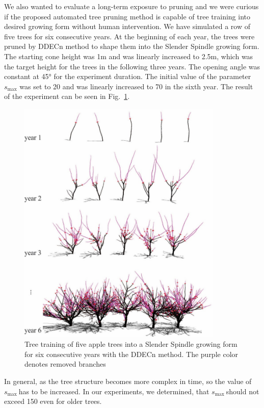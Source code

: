 We also wanted to evaluate a long-term exposure to pruning and we were
curious if the proposed automated tree pruning method is capable of tree
training into desired growing form without human intervention. We have
simulated a row of five trees for six consecutive years. At the
beginning of each year, the trees were pruned by DDECn method to shape
them into the Slender Spindle growing form. The starting cone height was
1m and was linearly increased to 2.5m, which was the target height for
the trees in the following three years. The opening angle was constant
at 45° for the experiment duration. The initial value of the parameter
\(s_{\mathrm{\max}}\) was set to 20 and was linearly increased to 70 in
the sixth year. The result of the experiment can be seen in Fig.~\ref{fig:my_figure7}.

\begin{figure}[hbt]
    \centering
    \includegraphics[width=3.84333in,height=4.66333in]{figs/image7.jpeg}
    \caption{Tree training of five apple trees into a Slender
Spindle growing form for six consecutive years with the DDECn method.
The purple color denotes removed branches}
    \label{fig:my_figure7}
\end{figure}


In general, as the tree structure becomes more complex in time, so the
value of \(s_{\mathrm{\max}}\ \)has to be increased. In our experiments,
we determined, that \(s_{\mathrm{\max}}\ \)should not exceed 150 even
for older trees.

